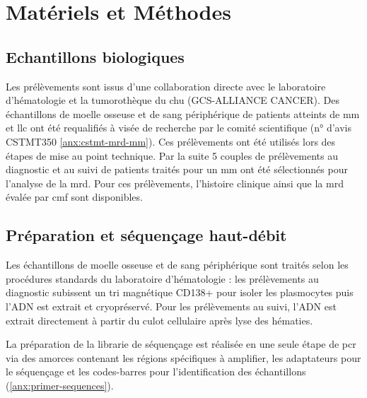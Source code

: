 \chapter{Matériels et Méthodes}

\section{Echantillons biologiques}

Les prélèvements sont issus d'une collaboration directe avec le laboratoire d'hématologie et la tumorothèque du 
\gls{chu} (GCS-ALLIANCE CANCER). Des échantillons de moelle osseuse et de sang périphérique de patients 
atteints de \gls{mm} et \gls{llc} ont été requalifiés à visée de recherche par le comité scientifique (n° d'avis CSTMT350 \autoref{anx:cstmt-mrd-mm}). 
Ces prélèvements ont été utilisés lors des étapes de mise au point technique. Par la suite 5 couples de prélèvements 
au diagnostic et au suivi de patients traités pour un \gls{mm} ont été sélectionnés pour l'analyse de la \gls{mrd}. Pour ces 
prélèvements, l'histoire clinique ainsi que la \gls{mrd} évalée par \gls{cmf} sont disponibles.

\section{Préparation et séquençage haut-débit}

Les échantillons de moelle osseuse et de sang périphérique sont traités selon les procédures standards du laboratoire 
d'hématologie : les prélèvements au diagnostic subissent un tri magnétique CD138+ pour isoler les plasmocytes puis l'ADN 
est extrait et cryopréservé. Pour les prélèvements au suivi, l'ADN est extrait directement à partir du culot cellulaire 
après lyse des hématies.

\vspace{1em}

La préparation de la librarie de séquençage est réalisée en une seule étape de \gls{pcr} via des amorces contenant les 
régions spécifiques à amplifier, les adaptateurs pour le séquençage et les codes-barres pour l'identification des échantillons 
(\autoref{anx:primer-sequences}).

\vspace{1em}

